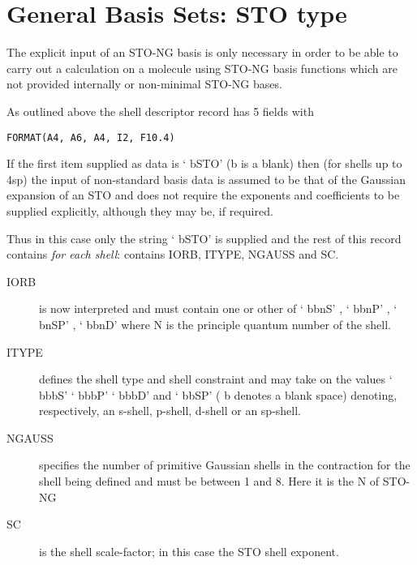 \section{\sf General Basis Sets: STO type}
The explicit input of an STO-NG basis is only necessary
in order to be able to carry out a calculation on a molecule
using STO-NG basis functions which are
not provided internally or non-minimal
STO-NG bases.

As outlined above the shell descriptor record has 5 fields with 
\begin{center}
{\tt FORMAT(A4, A6, A4, I2, F10.4) } 
\end{center}
If the first item supplied as data is ` bSTO' (b is a blank)
then (for shells up to 4sp) the input of non-standard basis data is
assumed to be that of the Gaussian expansion of an STO and does not
require the exponents and coefficients to be supplied explicitly,
although they may be, if required.

Thus in this case only the string ` bSTO' is supplied and the rest of this
record contains {\em for each shell}:
contains IORB, ITYPE, NGAUSS and SC. 
\begin{description}
\item[IORB] is now interpreted and must contain one or other of
` bbnS' , ` bbnP' , ` bnSP' , ` bbnD' where N is the
principle quantum number of the shell. 
\item[ITYPE]
defines the shell type and shell constraint and may take on the values
` bbbS' ` bbbP'  ` bbbD' and ` bbSP' ( b denotes a blank space) 
denoting, respectively,
an s-shell, p-shell, d-shell or an sp-shell. 
\item[NGAUSS] specifies the number of primitive
Gaussian shells in the contraction for the shell being defined and must
be between 1 and 8.  Here it is the N of STO-NG
\item[SC] is the shell scale-factor; in this case the STO shell exponent.  
\end{description}
\newpage
